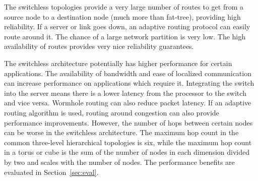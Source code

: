 The switchless topologies provide a very large number of routes to get from a source node to a destination node (much more than fat-tree), providing high reliability.  If a server or link goes down, an adaptive routing protocol can easily route around it.  The chance of a large network partition is very low.  The high availability of routes provides very nice reliability guarantees.

The switchless architecture potentially has higher performance for certain applications.  The availability of bandwidth and ease of localized communication can increase performance on applications which require it.  Integrating the switch into the server means there is a lower latency from the processor to the switch and vice versa.  Wormhole routing can also reduce packet latency.  If an adaptive routing algorithm is used, routing around congestion can also provide performance improvements.  However, the number of hops between certain nodes can be worse in the switchless architecture.  The maximum hop count in the common three-level hierarchical topologies is six, while the maximum hop count in a torus or cube is the sum of the number of nodes in each dimension divided by two and scales with the number of nodes.  The performance benefits are evaluated in Section~\ref{sec:eval}.

